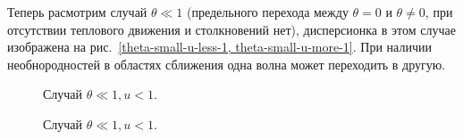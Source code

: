 \documentclass[10pt, a4paper]{article}
\begin{document}
Теперь расмотрим случай $\theta \ll 1$ (предельного перехода между $\theta=0$ и $\theta \neq 0$, при отсутствии
теплового движения и столкновений нет), дисперсионка в этом случае изображена на рис.~\ref{theta-small-u-less-1, theta-small-u-more-1}. При наличии необнородностей в областях сближения одна волна может переходить в другую.
\begin{figure}[h!]
    \caption{\label{theta-small-u-less-1} Случай $\theta\ll1, u < 1$.}
\end{figure}

\begin{figure}[h!]
    \caption{\label{theta-small-u-more-1} Случай $\theta\ll1, u < 1$.}
\end{figure}
\end{document}
